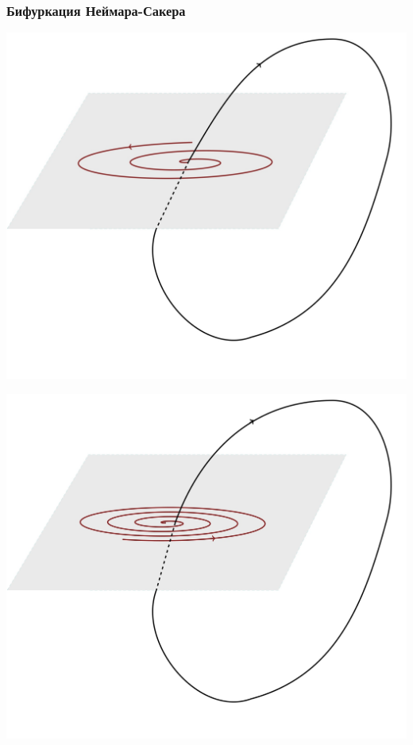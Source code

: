 \subsubsection{Бифуркация Неймара-Сакера}
\begin{center}
    \begin{minipage}{0.32\linewidth}
        \includegraphics[width=\linewidth]{fig/fig74.jpg} 
        \vspace{-50pt}
        \label{fig:1}
    \end{minipage}
\hfill     
    \begin{minipage}{0.3\linewidth}
        \includegraphics[width=\linewidth]{fig/fig75.jpg} 

\end{minipage}
\end{center}
